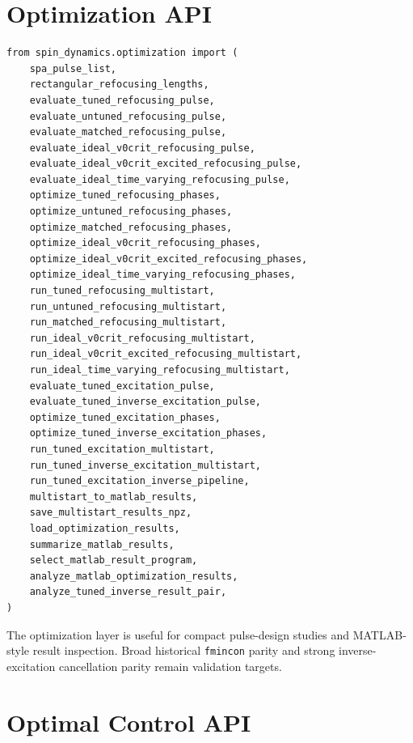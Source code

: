 \documentclass[11pt,oneside]{report}
\newcommand{\code}[1]{\texttt{#1}}
\begin{document}
\section{Optimization API}

\begin{lstlisting}
from spin_dynamics.optimization import (
    spa_pulse_list,
    rectangular_refocusing_lengths,
    evaluate_tuned_refocusing_pulse,
    evaluate_untuned_refocusing_pulse,
    evaluate_matched_refocusing_pulse,
    evaluate_ideal_v0crit_refocusing_pulse,
    evaluate_ideal_v0crit_excited_refocusing_pulse,
    evaluate_ideal_time_varying_refocusing_pulse,
    optimize_tuned_refocusing_phases,
    optimize_untuned_refocusing_phases,
    optimize_matched_refocusing_phases,
    optimize_ideal_v0crit_refocusing_phases,
    optimize_ideal_v0crit_excited_refocusing_phases,
    optimize_ideal_time_varying_refocusing_phases,
    run_tuned_refocusing_multistart,
    run_untuned_refocusing_multistart,
    run_matched_refocusing_multistart,
    run_ideal_v0crit_refocusing_multistart,
    run_ideal_v0crit_excited_refocusing_multistart,
    run_ideal_time_varying_refocusing_multistart,
    evaluate_tuned_excitation_pulse,
    evaluate_tuned_inverse_excitation_pulse,
    optimize_tuned_excitation_phases,
    optimize_tuned_inverse_excitation_phases,
    run_tuned_excitation_multistart,
    run_tuned_inverse_excitation_multistart,
    run_tuned_excitation_inverse_pipeline,
    multistart_to_matlab_results,
    save_multistart_results_npz,
    load_optimization_results,
    summarize_matlab_results,
    select_matlab_result_program,
    analyze_matlab_optimization_results,
    analyze_tuned_inverse_result_pair,
)
\end{lstlisting}

The optimization layer is useful for compact pulse-design studies and
MATLAB-style result inspection. Broad historical \code{fmincon} parity and
strong inverse-excitation cancellation parity remain validation targets.

\section{Optimal Control API}
\end{document}
